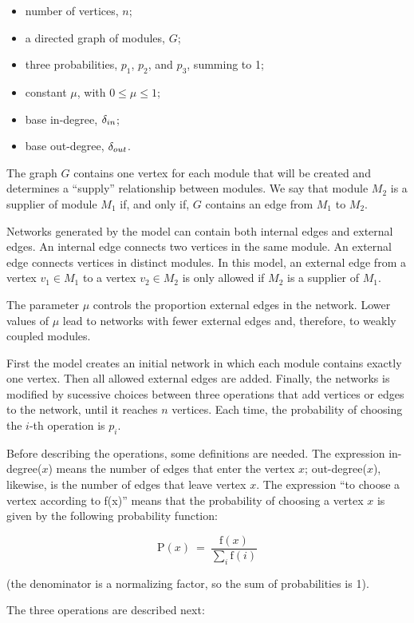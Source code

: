 \begin{itemize}
\item number of vertices, $n$;
\item a directed graph of modules, $G$;
\item three probabilities, $p_1$, $p_2$, and $p_3$, summing to 1;
\item constant $\mu$, with $0 \le \mu \le 1$;
\item base in-degree, $\delta_{in}$;
\item base out-degree, $\delta_{out}$.
\end{itemize}

The graph $G$ contains one vertex for each module that will be created and
determines a ``supply'' relationship between modules. We say that module $M_2$
is a supplier of module $M_1$ if, and only if, $G$ contains an edge from $M_1$
to $M_2$.  

Networks generated by the model can contain both internal edges and external
edges. An internal edge connects two vertices in the same module. An external
edge connects vertices in distinct modules. In this model, an external edge from
a vertex $v_1 \in M_1$ to a vertex $v_2 \in M_2$ is only allowed if $M_2$ is a
supplier of $M_1$.

The parameter $\mu$ controls the proportion external edges in the network. Lower
values of $\mu$ lead to networks with fewer external edges and, therefore, to
weakly coupled modules.

First the model creates an initial network in which each module contains exactly
one vertex. Then all allowed external edges are added. Finally, the networks is
modified by sucessive choices between three operations that add vertices or
edges to the network, until it reaches $n$ vertices. Each time, the probability
of choosing the $i$-th operation is $p_i$.

Before describing the operations, some definitions are needed. The expression
in-degree($x$) means the number of edges that enter the vertex $x$;
out-degree($x$), likewise, is the number of edges that leave vertex $x$. The
expression ``to choose a vertex according to f(x)'' means that the probability
of choosing a vertex $x$ is given by the following probability function:

$$
  \mathrm{P}(x) ~=~ \frac{ \mathrm{f}(x) }
  { \displaystyle\sum_{i} \mathrm{f}(i) }
$$

(the denominator is a normalizing factor, so the sum of probabilities is 1).

The three operations are described next:

